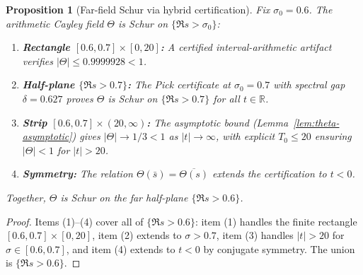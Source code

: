 \documentclass[11pt]{article}
\newtheorem{proposition}[theorem]{Proposition}
\theoremstyle{definition}
\theoremstyle{remark}
\theoremstyle{definition}
\begin{document}
\begin{proposition}[Far-field Schur via hybrid certification]\label{prop:farfield-hybrid}
Fix $\sigma_0 = 0.6$. The arithmetic Cayley field $\Theta$ is Schur on $\{\Re s > \sigma_0\}$:
\begin{enumerate}
\item \textbf{Rectangle $[0.6, 0.7] \times [0, 20]$:} A certified interval-arithmetic artifact verifies $|\Theta| \le 0.9999928 < 1$.
\item \textbf{Half-plane $\{\Re s > 0.7\}$:} The Pick certificate at $\sigma_0 = 0.7$ with spectral gap $\delta = 0.627$ proves $\Theta$ is Schur on $\{\Re s > 0.7\}$ for all $t \in \mathbb{R}$.
\item \textbf{Strip $[0.6, 0.7] \times (20, \infty)$:} The asymptotic bound (Lemma~\ref{lem:theta-asymptotic}) gives $|\Theta| \to 1/3 < 1$ as $|t| \to \infty$, with explicit $T_0 \le 20$ ensuring $|\Theta| < 1$ for $|t| > 20$.
\item \textbf{Symmetry:} The relation $\Theta(\bar{s}) = \overline{\Theta(s)}$ extends the certification to $t < 0$.
\end{enumerate}
Together, $\Theta$ is Schur on the far half-plane $\{\Re s > 0.6\}$.
\end{proposition}
\begin{proof}
Items (1)--(4) cover all of $\{\Re s > 0.6\}$: item (1) handles the finite rectangle $[0.6, 0.7] \times [0, 20]$, item (2) extends to $\sigma > 0.7$, item (3) handles $|t| > 20$ for $\sigma \in [0.6, 0.7]$, and item (4) extends to $t < 0$ by conjugate symmetry. The union is $\{\Re s > 0.6\}$.
\end{proof}
\end{document}
